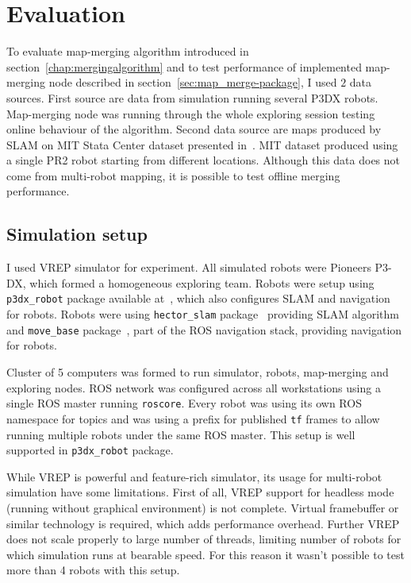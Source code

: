 \chapter{Evaluation}
\label{chap:evaluation}

To evaluate map-merging algorithm introduced in section~\ref{chap:mergingalgorithm} and to test performance of implemented map-merging node described in section~\ref{sec:map_merge-package}, I used $2$ data sources. First source are data from  simulation running several P3DX robots. Map-merging node was running through the whole exploring session testing online behaviour of the algorithm. Second data source are maps produced by \gls{SLAM} on \gls{MIT} Stata Center dataset presented in~\cite{Fallon2013}. \gls{MIT} dataset produced using a single PR2 robot starting from different locations. Although this data does not come from multi-robot mapping, it is possible to test offline merging performance.

\section{Simulation setup}

I used \gls{VREP} simulator for experiment. All simulated robots were Pioneers P3-DX, which formed a homogeneous exploring team. Robots were setup using \texttt{p3dx\_robot} package available at~\cite{GitHubRoboRescue}, which also configures \gls{SLAM} and navigation for robots. Robots were using \texttt{hector\_slam} package~\cite{2013:RoboCup} providing \gls{SLAM} algorithm and \texttt{move\_base} package~\cite{Marder2016}, part of the \gls{ROS} navigation stack, providing navigation for robots.

Cluster of 5 computers was formed to run simulator, robots, map-merging and exploring nodes. \gls{ROS} network was configured across all workstations using a single \gls{ROS} master running \texttt{roscore}. Every robot was using its own \gls{ROS} namespace for topics and was using a prefix for published \texttt{tf} frames to allow running multiple robots under the same \gls{ROS} master. This setup is well supported in \texttt{p3dx\_robot} package.

While \gls{VREP} is powerful and feature-rich simulator, its usage for multi-robot simulation have some limitations. First of all, \gls{VREP} support for headless mode (running without graphical environment) is not complete. Virtual framebuffer or similar technology is required, which adds performance overhead. Further \gls{VREP} does not scale properly to large number of threads, limiting number of robots for which simulation runs at bearable speed. For this reason it wasn't possible  to test more than 4 robots with this setup.

